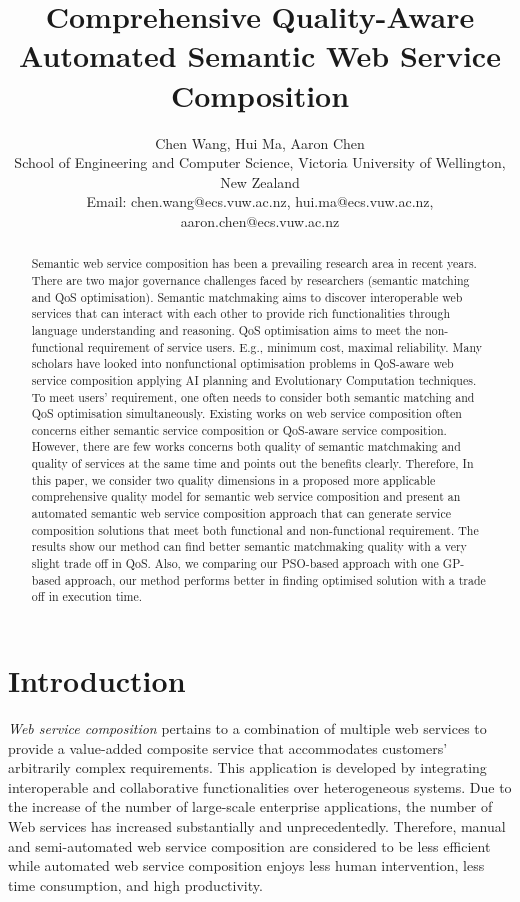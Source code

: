 \documentclass{IEEEtran}
\title{Comprehensive Quality-Aware Automated Semantic Web Service Composition}
\author{Chen Wang, Hui Ma, Aaron Chen\\ School of
 Engineering and Computer Science, Victoria University of Wellington, New Zealand\\
Email: chen.wang@ecs.vuw.ac.nz, hui.ma@ecs.vuw.ac.nz, aaron.chen@ecs.vuw.ac.nz}
\begin{document}
\maketitle
\begin{abstract}
Semantic web service composition has been a prevailing research area in recent years. There are two major governance challenges faced by researchers (semantic matching and QoS optimisation). Semantic matchmaking aims to discover interoperable web services that can interact with each other to provide rich functionalities through language understanding and reasoning. QoS optimisation aims to meet the non-functional requirement of service users. E.g., minimum cost, maximal reliability. Many scholars have looked into nonfunctional optimisation problems in QoS-aware web service composition applying AI planning and Evolutionary Computation techniques. To meet users' requirement, one often needs to consider both semantic matching and QoS optimisation simultaneously. Existing works on web service composition often concerns either semantic service composition or QoS-aware service composition. However, there are few works concerns both quality of semantic matchmaking and quality of services at the same time and points out the benefits clearly. Therefore, In this paper, we consider two quality dimensions in a proposed more applicable comprehensive quality model for semantic web service composition and present an automated semantic web service composition approach that can generate service composition solutions that meet both functional and non-functional requirement.  The results show our method can find better semantic matchmaking quality with a very slight trade off in QoS. Also, we comparing our PSO-based approach with one GP-based approach, our method performs better in finding optimised solution with a trade off in execution time.

\end{abstract}
\section{Introduction}\label{introduction}

\textit{Web service composition} pertains to a combination of multiple web services to provide a value-added composite service that accommodates customers' arbitrarily complex requirements. This application is developed by integrating interoperable and collaborative functionalities over heterogeneous systems. Due to the increase of the number of large-scale enterprise applications, the number of Web services has increased substantially and unprecedentedly. Therefore, manual and semi-automated web service composition are considered to be less efficient while automated web service composition enjoys less human intervention, less time consumption, and high productivity.
\end{document}
